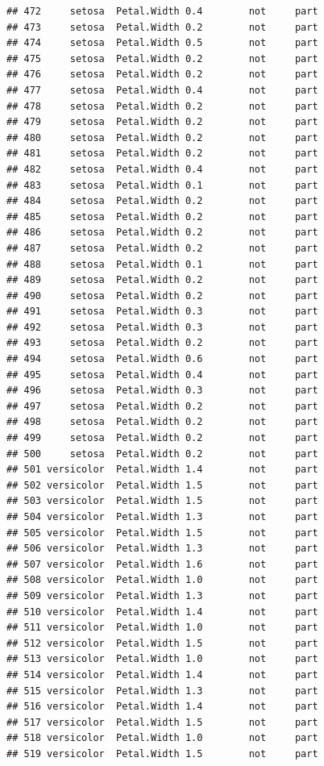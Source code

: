 \documentclass[krantz2]{krantz}\usepackage{knitr}%
\begin{document}
\begin{knitrout}
\begin{kframe}
\begin{verbatim}
## 472     setosa  Petal.Width 0.4        not     part
## 473     setosa  Petal.Width 0.2        not     part
## 474     setosa  Petal.Width 0.5        not     part
## 475     setosa  Petal.Width 0.2        not     part
## 476     setosa  Petal.Width 0.2        not     part
## 477     setosa  Petal.Width 0.4        not     part
## 478     setosa  Petal.Width 0.2        not     part
## 479     setosa  Petal.Width 0.2        not     part
## 480     setosa  Petal.Width 0.2        not     part
## 481     setosa  Petal.Width 0.2        not     part
## 482     setosa  Petal.Width 0.4        not     part
## 483     setosa  Petal.Width 0.1        not     part
## 484     setosa  Petal.Width 0.2        not     part
## 485     setosa  Petal.Width 0.2        not     part
## 486     setosa  Petal.Width 0.2        not     part
## 487     setosa  Petal.Width 0.2        not     part
## 488     setosa  Petal.Width 0.1        not     part
## 489     setosa  Petal.Width 0.2        not     part
## 490     setosa  Petal.Width 0.2        not     part
## 491     setosa  Petal.Width 0.3        not     part
## 492     setosa  Petal.Width 0.3        not     part
## 493     setosa  Petal.Width 0.2        not     part
## 494     setosa  Petal.Width 0.6        not     part
## 495     setosa  Petal.Width 0.4        not     part
## 496     setosa  Petal.Width 0.3        not     part
## 497     setosa  Petal.Width 0.2        not     part
## 498     setosa  Petal.Width 0.2        not     part
## 499     setosa  Petal.Width 0.2        not     part
## 500     setosa  Petal.Width 0.2        not     part
## 501 versicolor  Petal.Width 1.4        not     part
## 502 versicolor  Petal.Width 1.5        not     part
## 503 versicolor  Petal.Width 1.5        not     part
## 504 versicolor  Petal.Width 1.3        not     part
## 505 versicolor  Petal.Width 1.5        not     part
## 506 versicolor  Petal.Width 1.3        not     part
## 507 versicolor  Petal.Width 1.6        not     part
## 508 versicolor  Petal.Width 1.0        not     part
## 509 versicolor  Petal.Width 1.3        not     part
## 510 versicolor  Petal.Width 1.4        not     part
## 511 versicolor  Petal.Width 1.0        not     part
## 512 versicolor  Petal.Width 1.5        not     part
## 513 versicolor  Petal.Width 1.0        not     part
## 514 versicolor  Petal.Width 1.4        not     part
## 515 versicolor  Petal.Width 1.3        not     part
## 516 versicolor  Petal.Width 1.4        not     part
## 517 versicolor  Petal.Width 1.5        not     part
## 518 versicolor  Petal.Width 1.0        not     part
## 519 versicolor  Petal.Width 1.5        not     part

\end{verbatim}
\end{kframe}
\end{knitrout}
\end{document}
